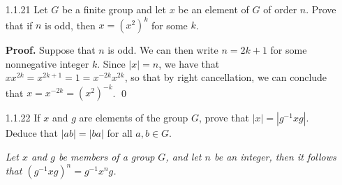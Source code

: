 \begin{enumerate}
      \textbf{Case 2.} \textit{$|x| = \infty$}. Suppose to the contrary that
      $|x^{-1}| = n \in \Z^+$. As we argued in Case 1, it must be the case that
      $x^n = 1$, a contradiction. Thus $|x| = \infty = |x^{-1}|$. \qed
   \item[1.1.21]  Let $G$ be a finite group and let $x$ be an element of $G$ of
                  order $n$. Prove that if $n$ is odd, then $x = (x^2)^k$ for
                  some $k$.

      \textbf{Proof.} Suppose that $n$ is odd. We can then write $n = 2k + 1$
      for some nonnegative integer $k$. Since $|x| = n$, we have that
      $xx^{2k} = x^{2k+1} = 1 = x^{-2k}x^{2k}$, so that by right cancellation,
      we can conclude that $x = x^{-2k} = (x^2)^{-k}$. \qed
   \item[1.1.22]  If $x$ and $g$ are elements of the group $G$, prove that
                  $|x| = |g^{-1}xg|$. Deduce that $|ab| = |ba|$ for all
                  $a, b \in G$.

      \begin{lemma} \label{1_1_22_1} \textit{Let $x$ and $g$ be members of a 
                  group $G$, and let $n$ be an integer, then it follows that
                  $(g^{-1}xg)^n = g^{-1}x^ng$.}
      \end{lemma}


\end{enumerate}
